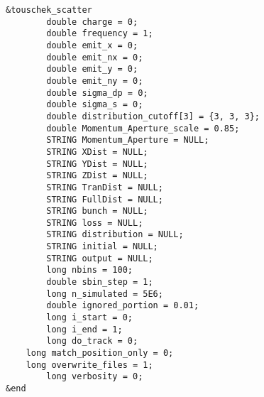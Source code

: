 \documentclass[11pt]{article}
\begin{document}
\begin{verbatim}
&touschek_scatter
        double charge = 0;
        double frequency = 1;
        double emit_x = 0;
        double emit_nx = 0;
        double emit_y = 0;
        double emit_ny = 0;
        double sigma_dp = 0;
        double sigma_s = 0;
        double distribution_cutoff[3] = {3, 3, 3};
        double Momentum_Aperture_scale = 0.85;
        STRING Momentum_Aperture = NULL;
        STRING XDist = NULL;
        STRING YDist = NULL;
        STRING ZDist = NULL;
        STRING TranDist = NULL;
        STRING FullDist = NULL;
        STRING bunch = NULL;
        STRING loss = NULL;
        STRING distribution = NULL;
        STRING initial = NULL;
        STRING output = NULL;
        long nbins = 100;
        double sbin_step = 1;
        long n_simulated = 5E6;
        double ignored_portion = 0.01;
        long i_start = 0;
        long i_end = 1;
        long do_track = 0;
	long match_position_only = 0;
	long overwrite_files = 1;
        long verbosity = 0;
&end
\end{verbatim}
\end{document}
